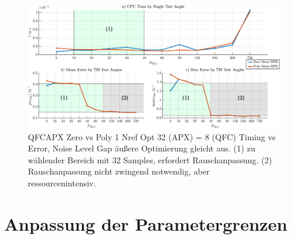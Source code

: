 \begin{figure}[tbph]
	\centering
	\includegraphics[width=\linewidth]{appendix/images/8-Ergebnisse-Experimente/Timings-vs-Errors}
	\caption[Timing vs Error]{QFCAPX Zero vs Poly 1 Nref Opt 32 (APX) = 8 (QFC) Timing vs Error, Noise Level Gap äußere Optimierung gleicht aus. (1) zu wählender Bereich mit 32 Samples, erfordert Rauschanpassung. (2) Rauschanpassung nicht zwingend notwendig, aber ressourcenintensiv.}
	\label{fig:timings-vs-errors}
\end{figure}



\section{Anpassung der Parametergrenzen}\label{sec:ergexp4}


